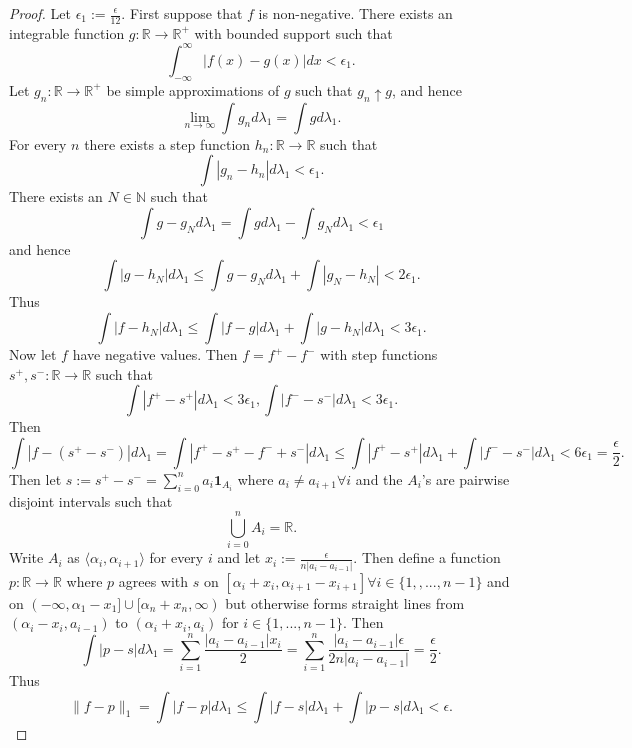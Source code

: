 \documentclass{article}
\begin{document}
\begin{proof}
Let $\epsilon_1:=\frac{\epsilon}{12}$. First suppose that $f$ is non-negative. There exists an integrable function $g:\mathbb{R}\to\mathbb{R}^+$ with bounded support such that \[\int_{-\infty}^\infty|f(x)-g(x)|dx<\epsilon_1.\] Let $g_n:\mathbb{R}\to\mathbb{R}^+$ be simple approximations of $g$ such that $g_n\uparrow g$, and hence \[\lim_{n\to\infty}\int g_nd\lambda_1=\int gd\lambda_1.\] For every $n$ there exists a step function $h_n:\mathbb{R}\to\mathbb{R}$ such that \[\int|g_n-h_n|d\lambda_1<\epsilon_1.\] There exists an $N\in\mathbb{N}$ such that \[\int g-g_Nd\lambda_1=\int gd\lambda_1-\int g_Nd\lambda_1<\epsilon_1\]and hence\[\int|g-h_N|d\lambda_1\leq\int g-g_Nd\lambda_1+\int|g_N-h_N|<2\epsilon_1.\]Thus \[\int|f-h_N|d\lambda_1\leq\int|f-g|d\lambda_1+\int|g-h_N|d\lambda_1<3\epsilon_1.\]Now let $f$ have negative values. Then $f=f^+-f^-$ with step functions $s^+,s^-:\mathbb{R}\to\mathbb{R}$ such that \[\int|f^+-s^+|d\lambda_1<3\epsilon_1,\int|f^--s^-|d\lambda_1<3\epsilon_1.\]Then \[\int|f-(s^+-s^-)|d\lambda_1=\int|f^+-s^+-f^-+s^-|d\lambda_1\leq\int|f^+-s^+|d\lambda_1+\int|f^--s^-|d\lambda_1<6\epsilon_1=\frac{\epsilon}{2}.\]Then let $s:=s^+-s^-=\sum_{i=0}^na_i\mathbf{1}_{A_i}$ where $a_i\neq a_{i+1}\forall i$ and the $A_i$'s are pairwise disjoint intervals such that \[\bigcup_{i=0}^n A_i=\mathbb{R}.\] Write $A_i$ as $\langle \alpha_i,
\alpha_{i+1}\rangle$ for every $i$ and let $x_i:=\frac{\epsilon}{n|a_i-a_{i-1}|}$. Then define a function $p:\mathbb{R}\to\mathbb{R}$ where $p$ agrees with $s$ on $[\alpha_i+x_i,\alpha_{i+1}-x_{i+1}]\forall i\in\{1,,...,n-1\}$ and on $(-\infty,\alpha_1-x_1]\cup[\alpha_n+x_n,\infty)$ but otherwise forms straight lines from $(\alpha_i-x_i,a_{i-1})$ to $(\alpha_{i}+x_i,a_{i})$ for $i\in\{1,...,n-1\}$. Then \[\int|p-s|d\lambda_1=\sum_{i=1}^{n}\frac{|a_i-a_{i-1}|x_i}{2}=\sum_{i=1}^n\frac{|a_i-a_{i-1}|\epsilon}{2n|a_i-a_{i-1}|}=\frac{\epsilon}{2}.\] Thus \[\| f-p\|_1=\int|f-p|d\lambda_1\leq\int|f-s|d\lambda_1+\int|p-s|d\lambda_1<\epsilon.\]

\end{proof}
\end{document}

